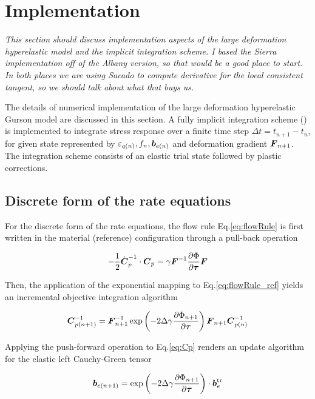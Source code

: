 \chapter{Implementation}
\label{implementation}

\textit{This section should discuss implementation aspects of the
  large deformation hyperelastic model and the implicit integration
  scheme. I based the Sierra implementation off of the Albany version,
  so that would be a good place to start. In both places we are using
  Sacado to compute derivative for the local consistent tangent, so we
  should talk about what that buys us.}

The details of numerical implementation of the large deformation hyperelastic Gurson model are discussed in this section. A fully implicit integration scheme (\cite{SimoHughes:98, Steinmann1994}) is implemented to integrate stress response over a finite time step $\Delta t = t_{n+1} - t_n$, for given state represented by $\varepsilon_{q(n)}, f_n, {\boldsymbol{b}}_{e(n)}$ and deformation gradient ${\boldsymbol{F}}_{n+1}$. The integration scheme consists of an elastic trial state followed by plastic corrections.

\section{Discrete form of the rate equations}

For the discrete form of the rate equations, the flow rule Eq.\eqref{eq:flowRule} is first written in the material (reference) configuration through a pull-back operation

\begin{equation}\label{eq:flowRule_ref}
-\frac{1}{2}\dot{{\boldsymbol{C}}}_p^{-1}\cdot{\boldsymbol{C}}_p = \gamma{\boldsymbol{F}}^{-1}\frac{\partial\Phi}{\partial{\boldsymbol{\tau}}}{\boldsymbol{F}}
\end{equation}

Then, the application of the exponential mapping to Eq.\eqref{eq:flowRule_ref} yields an incremental objective integration algorithm

\begin{equation}\label{eq:Cp}
{\boldsymbol{C}}_{p(n+1)}^{-1} = {\boldsymbol{F}}_{n+1}^{-1}\exp\left( -2\Delta\gamma \frac{\partial\Phi_{n+1}}{\partial{\boldsymbol{\tau}}}\right){\boldsymbol{F}}_{n+1}{\boldsymbol{C}}_{p(n)}^{-1}
\end{equation}

Applying the push-forward operation to Eq.\eqref{eq:Cp} renders an update algorithm for the elastic left Cauchy-Green tensor

\begin{equation}\label{eq:be_n}
{\boldsymbol{b}}_{e(n+1)} = \exp\left( -2\Delta\gamma\frac{\partial\Phi_{n+1}}{\partial{\boldsymbol{\tau}}}\right)\cdot{\boldsymbol{b}}_e^{\operatorname{\text{tr}}}
\end{equation}

